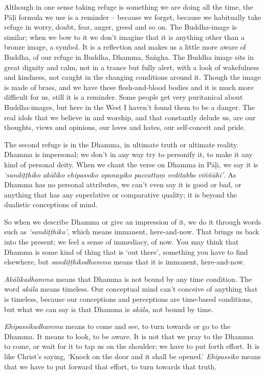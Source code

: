 Although in one sense taking refuge is something we are doing all the time, the P\=a\d{l}i formula we use is a reminder -- because we forget, because we habitually take refuge in worry, doubt, fear, anger, greed and so on. The Buddha-image is similar; when we bow to it we don't imagine that it is anything other than a bronze image, a symbol. It is a reflection and makes us a little more aware of Buddha, of our refuge in Buddha, Dhamma, Sa\.ngha. The Buddha image sits in great dignity and calm, not in a trance but fully alert, with a look of wakefulness and kindness, not caught in the changing conditions around it. Though the image is made of brass, and we have these flesh-and-blood bodies and it is much more difficult for us, still it is a reminder. Some people get very puritanical about Buddha-images, but here in the West I haven't found them to be a danger. The real idols that we believe in and worship, and that constantly delude us, are our thoughts, views and opinions, our loves and hates, our self-conceit and pride.

The second refuge is in the Dhamma, in ultimate truth or ultimate reality. Dhamma is impersonal; we don't in any way try to personify it, to make it any kind of personal deity. When we chant the verse on Dhamma in P\=a\d{l}i, we say it is \textit{`sandi\d{t}\d{t}hiko ak\=aliko ehipassiko opanayiko paccatta\d{m} veditabbo vi\~n\~n\=uhi'}. As Dhamma has no personal attributes, we can't even say it is good or bad, or anything that has any superlative or comparative quality; it is beyond the dualistic conceptions of mind.

So when we describe Dhamma or give an impression of it, we do it through words such as \textit{`sandi\d{t}\d{t}hiko'}, which means immanent, here-and-now. That brings us back into the present; we feel a sense of immediacy, of now. You may think that Dhamma is some kind of thing that is `out there', something you have to find elsewhere, but \textit{san\-di\d{t}\d{t}hiko\-dhamma} means that it is immanent, here-and-now.

\textit{Ak\=alikadhamma} means that Dhamma is not bound by any time condition. The word \textit{ak\=ala} means timeless. Our conceptual mind can't conceive of anything that is timeless, because our conceptions and perceptions are time-based conditions, but what we can say is that Dhamma is \textit{ak\=ala}, not bound by time.

\textit{Ehipassikadhamma} means to come and see, to turn towards or go to the Dhamma. It means to look, to be aware. It is not that we pray to the Dhamma to come, or wait for it to tap us on the shoulder; we have to put forth effort. It is like Christ's saying, `Knock on the door and it shall be opened.' \textit{Ehipassiko} means that we have to put forward that effort, to turn towards that truth.

